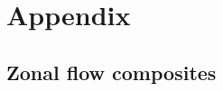 \appendix
\section{Appendix}\label{s:appendix}

\subsection{Zonal flow composites}\label{s:zonal_composites}

